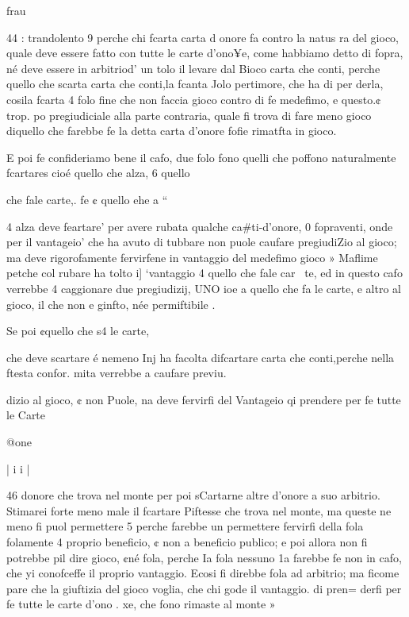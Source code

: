 \documentclass[12pt,a6paper]{article}
\begin{document}
frau
 
 

 

 

 

 

 

44 :
trandolento 9 perche chi fcarta
carta d onore fa contro la natus
ra del gioco, quale deve essere
fatto con tutte le carte d’ono¥e, come habbiamo detto di fopra, né deve essere in arbitriod’
un tolo il levare dal Bioco carta
che conti, perche quello che
scarta carta che conti,la fcanta
Jolo pertimore, che ha di per
derla, cosila fcarta 4 folo fine
che non faccia gioco contro di
fe medefimo, e questo.¢ trop.
po pregiudiciale alla parte contraria, quale fi trova di fare meno gioco diquello che farebbe
fe la detta carta d’onore fofie
rimatfta in gioco.

E poi fe confideriamo bene
il cafo, due folo fono quelli che
poffono naturalmente fcartares
cioé quello che alza, 6 quello

che fale carte,. fe ¢ quello ehe
a “
 

4
alza deve feartare’ per avere
rubata qualche ca#ti-d’onore,
0 fopraventi, onde per il vantageio’ che ha avuto di tubbare non puole caufare pregiudiZio al gioco; ma deve rigorofamente fervirfene in vantaggio
del medefimo gioco » Maflime
petche col rubare ha tolto i]
‘vantaggio 4 quello che fale car~
te, ed in questo cafo verrebbe
4 caggionare due pregiudizij,
UNO ioe a quello che fa le carte, e altro al gioco, il che non
e ginfto, née permiftibile .

Se poi ¢quello che s4 le carte,

che deve scartare é nemeno Inj
ha facolta difcartare carta che
conti,perche nella ftesta confor.
mita verrebbe a caufare previu.

dizio al gioco, ¢ non Puole, na
deve fervirfi del Vantageio qi
prendere per fe tutte le Carte

@one~

 
 

 

 

 

|
i
i
|

46
donore che trova nel monte
per poi sCartarne altre d’onore
a suo arbitrio. Stimarei forte
meno male il fcartare Piftesse
che trova nel monte, ma queste
ne meno fi puol permettere 5
perche farebbe un permettere
fervirfi della fola folamente 4
proprio beneficio, ¢ non a beneficio publico; e poi allora non
fi potrebbe pil dire gioco, ¢né
fola, perche Ia fola nessuno 1a
farebbe fe non in cafo, che yi
conofceffe il proprio vantaggio. Ecosi fi direbbe fola ad
arbitrio; ma ficome pare che la
giuftizia del gioco voglia, che
chi gode il vantaggio. di pren=
derfi per fe tutte le carte d’ono
. xe, che fono rimaste al monte »
\end{document}
